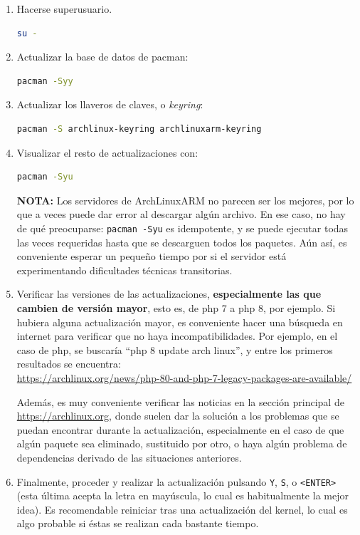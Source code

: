 \begin{enumerate}
    \item Hacerse superusuario.
\begin{lstlisting}[language=bash]
su -
\end{lstlisting}
    \item Actualizar la base de datos de pacman:
\begin{lstlisting}[language=bash]
pacman -Syy
\end{lstlisting}
    \item Actualizar los llaveros de claves, o \textit{keyring}:
\begin{lstlisting}[language=bash]
pacman -S archlinux-keyring archlinuxarm-keyring
\end{lstlisting}
    \item Visualizar el resto de actualizaciones con:
\begin{lstlisting}[language=bash]
pacman -Syu
\end{lstlisting}
    \textbf{NOTA:} Los servidores de ArchLinuxARM no parecen ser los mejores, por lo que a veces puede dar error al descargar algún archivo. En ese caso, no hay de qué preocuparse: \texttt{pacman -Syu} es idempotente, y se puede ejecutar todas las veces requeridas hasta que se descarguen todos los paquetes. Aún así, es conveniente esperar un pequeño tiempo por si el servidor está experimentando dificultades técnicas transitorias.
    
    \item Verificar las versiones de las actualizaciones, \textbf{especialmente las que cambien de versión mayor}, esto es, de php 7 a php 8, por ejemplo. Si hubiera alguna actualización mayor, es conveniente hacer una búsqueda en internet para verificar que no haya incompatibilidades.
    Por ejemplo, en el caso de php, se buscaría ``php 8 update arch linux'', y entre los primeros resultados se encuentra: \\\footnotesize\url{https://archlinux.org/news/php-80-and-php-7-legacy-packages-are-available/}\normalsize

    Además, es muy conveniente verificar las noticias en la sección principal de \url{https://archlinux.org}, donde suelen dar la solución a los problemas que se puedan encontrar durante la actualización, especialmente en el caso de que algún paquete sea eliminado, sustituido por otro, o haya algún problema de dependencias derivado de las situaciones anteriores.

    \item Finalmente, proceder y realizar la actualización pulsando \texttt{Y}, \texttt{S}, o \texttt{<ENTER>} (esta última acepta la letra en mayúscula, lo cual es habitualmente la mejor idea). Es recomendable reiniciar tras una actualización del kernel, lo cual es algo probable si éstas se realizan cada bastante tiempo.
\end{enumerate}

